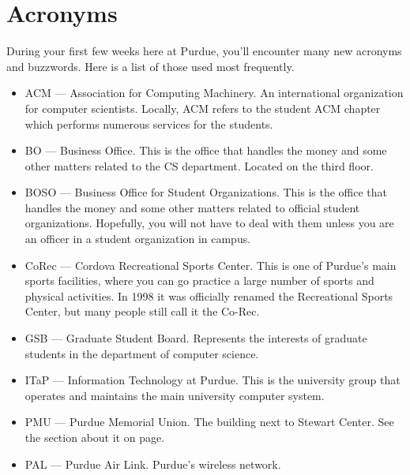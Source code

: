 \section{Acronyms}

During your first few weeks here at Purdue, you'll encounter many new acronyms and buzzwords. Here is a list of those used most frequently.

\begin{itemize}
	\item ACM --- Association for Computing Machinery. An international organization for computer scientists. Locally, ACM refers to the student ACM chapter which performs numerous services for the students.

	\item BO --- Business Office. This is the office that handles the money and some other matters related to the CS department. Located on the third floor.

	\item BOSO --- Business Office for Student Organizations. This is the office that handles the money and some other matters related to official student organizations. Hopefully, you will not have to deal with them unless you are an officer in a student organization in campus.

	\item CoRec --- Cordova Recreational Sports Center. This is one of Purdue's main sports facilities, where you can go practice a large number of sports and physical activities. In 1998 it was officially renamed the Recreational Sports Center, but many people still call it the Co-Rec.

	\item GSB --- Graduate Student Board. Represents the interests of graduate students in the department of computer science.

	\item ITaP --- Information Technology at Purdue. This is the university group that operates and maintains the main university computer system.

	\item PMU --- Purdue Memorial Union. The building next to Stewart Center. See the section about it on page.

	\item PAL --- Purdue Air Link. Purdue's wireless network.

\end{itemize}